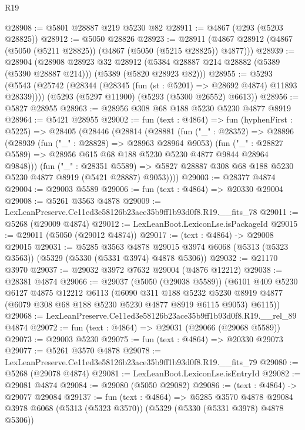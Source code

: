 \begin{lexlean}{R19}
\begin{coremodule}
@28908 := @5801 @28887 @219 @5230 @82
@28911 := @4867 (@293 (@5203 @28825))
@28912 := @5050 @28826
@28923 := @28911 (@4867 @28912 (@4867 (@5050 (@5211 @28825)) (@4867 (@5050 (@5215 @28825)) @4877)))
@28939 := @28904
    (@28908
      @28923
      @32
      @28912
      (@5384 @28887 @214 @28882 (@5389 (@5390 @28887 @214)))
      (@5389 (@5820 @28923 @82)))
@28955 := @5293
    (@5543 (@25742 (@28344 (@28345 (fun (st : @5201) => @28692 @4874) @11893 @28339))))
    (@5293 (@5297 @11900) (@5293 (@5300 @26552) @6613))
@28956 := @5827 @28955
@28963 := @28956 @308 @68 @188 @5230 @5230 @4877 @8919
@28964 := @5421 @28955
@29002 := fun (text : @4864) =>
  fun (hyphenFirst : @5225) =>
  @28405
    (@28446
      (@28814
        (@28881
          (fun ("_" : @28352) =>
          @28896
            (@28939
              (fun ("_" : @28828) => @28963 @28964 @9053)
              (fun ("_" : @28827 @5589) =>
              @28956 @615 @68 @188 @5230 @5230 @4877 @9844 @28964 @9848)))
          (fun ("_" : @28351 @5589) =>
          @5827 @28887 @308 @68 @188 @5230 @5230 @4877 @8919 (@5421 @28887) @9053))))
@29003 := @28377 @4874
@29004 := @29003 @5589
@29006 := fun (text : @4864) => @20330 @29004
@29008 := @5261 @3563 @4878
@29009 := LexLeanPreserve.Ce11ed3e58126b23ace35b9ff1b93d0f8.R19.__fits_78
@29011 := @5268 (@29009 @4874)
@29012 := LexLeanBoot.LexiconLse.isPackageId
@29015 := @29011 (@5050 (@29012 @4874))
@29017 := (text : @4864) -> @29008 @29015
@29031 := @5285
    @3563
    @4878
    @29015
    @3974
    @6068
    (@5313 (@5323 @3563))
    (@5329 (@5330 (@5331 @3974) @4878 @5306))
@29032 := @21170 @3970
@29037 := @29032 @3972 @7632 @29004 (@4876 @12212)
@29038 := @28381 @4874
@29066 := @29037
    (@5050 (@29038 @5589))
    (@6101
      @409
      @5230
      @6127
      @4875
      @12212
      @6113
      (@6090
        @311
        @188
        @5232
        @5230
        @8919
        @4877
        (@6079 @308 @68 @188 @5230 @5230 @4877 @8919 @6115 @9053)
        @6115))
@29068 := LexLeanPreserve.Ce11ed3e58126b23ace35b9ff1b93d0f8.R19.__rel_89 @4874
@29072 := fun (text : @4864) => @29031 (@29066 (@29068 @5589))
@29073 := @29003 @5230
@29075 := fun (text : @4864) => @20330 @29073
@29077 := @5261 @3570 @4878
@29078 := LexLeanPreserve.Ce11ed3e58126b23ace35b9ff1b93d0f8.R19.__fits_79
@29080 := @5268 (@29078 @4874)
@29081 := LexLeanBoot.LexiconLse.isEntryId
@29082 := @29081 @4874
@29084 := @29080 (@5050 @29082)
@29086 := (text : @4864) -> @29077 @29084
@29137 := fun (text : @4864) =>
  @5285
    @3570
    @4878
    @29084
    @3978
    @6068
    (@5313 (@5323 @3570))
    (@5329 (@5330 (@5331 @3978) @4878 @5306))

\end{coremodule}
\end{lexlean}
